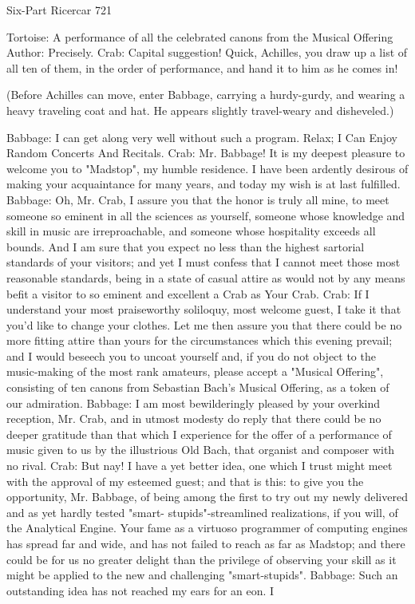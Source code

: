 Six-Part Ricercar                                                                      721

Tortoise: A performance of all the celebrated canons from the Musical Offering
Author: Precisely.
Crab: Capital suggestion! Quick, Achilles, you draw up a list of all ten of them, in the
  order of performance, and hand it to him as he comes in!

  (Before Achilles can move, enter Babbage, carrying a hurdy-gurdy, and wearing a
     heavy traveling coat and hat. He appears slightly travel-weary and disheveled.)

Babbage: I can get along very well without such a program. Relax; I Can Enjoy Random
  Concerts And Recitals.
Crab: Mr. Babbage! It is my deepest pleasure to welcome you to "Madstop", my humble
  residence. I have been ardently desirous of making your acquaintance for many years,
  and today my wish is at last fulfilled.
Babbage: Oh, Mr. Crab, I assure you that the honor is truly all mine, to meet someone so
  eminent in all the sciences as yourself, someone whose knowledge and skill in music
  are irreproachable, and someone whose hospitality exceeds all bounds. And I am sure
  that you expect no less than the highest sartorial standards of your visitors; and yet I
  must confess that I cannot meet those most reasonable standards, being in a state of
  casual attire as would not by any means befit a visitor to so eminent and excellent a
  Crab as Your Crab.
Crab: If I understand your most praiseworthy soliloquy, most welcome guest, I take it
  that you'd like to change your clothes. Let me then assure you that there could be no
  more fitting attire than yours for the circumstances which this evening prevail; and I
  would beseech you to uncoat yourself and, if you do not object to the music-making of
  the most rank amateurs, please accept a "Musical Offering", consisting of ten canons
  from Sebastian Bach's Musical Offering, as a token of our admiration.
Babbage: I am most bewilderingly pleased by your overkind reception, Mr. Crab, and in
  utmost modesty do reply that there could be no deeper gratitude than that which I
  experience for the offer of a performance of music given to us by the illustrious Old
  Bach, that organist and composer with no rival.
Crab: But nay! I have a yet better idea, one which I trust might meet with the approval of
  my esteemed guest; and that is this: to give you the opportunity, Mr. Babbage, of
  being among the first to try out my newly delivered and as yet hardly tested "smart-
  stupids"-streamlined realizations, if you will, of the Analytical Engine. Your fame as a
  virtuoso programmer of computing engines has spread far and wide, and has not failed
  to reach as far as Madstop; and there could be for us no greater delight than the
  privilege of observing your skill as it might be applied to the new and challenging
  "smart-stupids".
Babbage: Such an outstanding idea has not reached my ears for an eon. I




